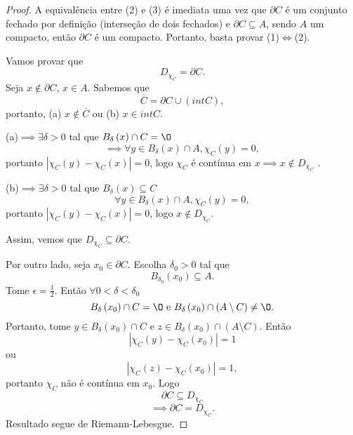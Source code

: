 \begin{proof}
    A equivalência entre (2) e (3) é imediata uma vez que $\partial C$ é um conjunto fechado por definição (interseção de dois fechados) e $\partial C \subseteq A$, sendo $A$ um compacto, então $\partial C$ é um compacto. Portanto, basta provar (1)$\iff$(2).

    Vamos provar que \[
    D_{\chi_C} = \partial C
    .\] Seja $x\not\in \partial C$, $x\in A$. Sabemos que \[
    \overline{C} = \partial C \cup \left( int C \right) 
,\] portanto, (a) $x\not\in \overline{C}$ ou (b) $x\in int C$.

(a)$\implies \exists \delta>0$ tal que $B_{\delta}\left( x \right) \cap C = \O$ \[
\implies \forall y\in B_{\delta}\left( x \right) \cap A, \chi_C\left( y \right) = 0
,\] portanto $\left| \chi_C\left( y \right) - \chi_C\left( x \right)  \right| =0$, logo $\chi_C$ é contínua em $x \implies x\not\in D_{\chi_C}$ .

(b)$\implies \exists \delta>0$ tal que $B_\delta\left( x \right) \subseteq C$ \[
\forall y\in B_\delta\left( x \right) \cap A, \chi_C\left( y \right) = 0
,\] portanto $\left| \chi_C\left( y \right) -\chi_C\left( x \right)  \right| =0$, logo $x\not\in D_{\chi_C}$.

Assim, vemos que $D_{\chi_C}\subseteq\partial C$.

Por outro lado, seja $x_0\in \partial C$. Escolha $\delta_0>0$ tal que \[
B_{\delta_0}\left( x_0 \right) \subseteq A
.\] Tome $\epsilon = \frac{1}{2}$. Então $\forall 0<\delta < \delta_0$\[
B_{\delta}\left( x_0 \right) \cap C = \O \text{ e }B_{\delta}\left( x_0 \right) \cap \left( A\setminus C \right) \neq \O
.\] Portanto, tome $y\in B_{\delta}\left( x_0 \right) \cap C$ e $z\in B_{\delta}\left( x_0 \right) \cap \left( A\setminus C \right)$. Então \[
\left| \chi_C\left( y \right) -\chi_C\left( x_0 \right)  \right| = 1
\] ou \[
\left| \chi_C\left( z \right) -\chi_C\left( x_0 \right)  \right| = 1
,\] portanto $\chi_C$ não é contínua em $x_0$. Logo \[
\partial C \subseteq D_{\chi_C}
\] \[
\implies \partial C = D_{\chi_C}
.\] Resultado segue de Riemann-Lebesgue.
\end{proof}

